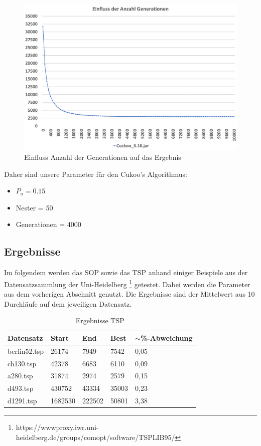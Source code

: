 \documentclass[conference]{IEEEtran}
\begin{document}
      \begin{figure}[H]
        \centering
        \includegraphics[width=0.8\linewidth]{Generation2.png}
        \caption{Einfluss Anzahl der Generationen auf das Ergebnis}
        \label{fig:generation}
      \end{figure}

      Daher sind unsere Parameter für den Cukoo's Algorithmus:
      \begin{itemize}
        \item $P_a = 0.15$
        \item Nester = 50
        \item Generationen = 4000
      \end{itemize}

    \subsection{Ergebnisse}
      Im folgendem werden das SOP sowie das TSP anhand einiger Beispiele aus der Datensatzsammlung der Uni-Heidelberg
      \footnote{https://wwwproxy.iwr.uni-heidelberg.de/groups/comopt/software/TSPLIB95/} getestet.
      Dabei werden die Parameter aus dem vorherigen Abschnitt genutzt. 
      Die Ergebnisse sind der Mittelwert aus 10 Durchläufe auf dem jeweiligen Datensatz.



      \begin{table}[H]
        \label{table:TSP}
        \centering
        \begin{tabular}{|l|ll|l|l|}
        \hline
            Datensatz & \multicolumn{1}{l|}{Start} & End  & Best & $\sim$\%-Abweichung \\ \hline
            berlin52.tsp  & \multicolumn{1}{l|}{26174} & 7949 & 7542 & 0,05       \\ \hline
            ch130.tsp  & \multicolumn{1}{l|}{42378} & 6683 & 6110 & 0,09       \\ \hline
            a280.tsp  & \multicolumn{1}{l|}{31874} & 2974 & 2579 & 0,15       \\ \hline
            d493.tsp  & \multicolumn{1}{l|}{430752} & 43334 & 35003 & 0,23       \\ \hline
            d1291.tsp  & \multicolumn{1}{l|}{1682530} & 222502 & 50801 & 3,38       \\ \hline
        \end{tabular}
        \caption{Ergebnisse TSP}
      \end{table}
\end{document}
